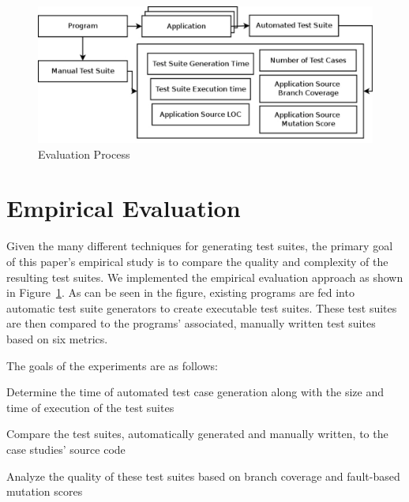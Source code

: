
\begin{figure}[!t]
\centering
\captionsetup{justification=centering}
  \includegraphics[width=\linewidth]{proccess_diagram.pdf}
  \caption{Evaluation Process
  \label{fig:process_diagram}
  }
\end{figure}

\section{Empirical Evaluation}
\label{sec:evaluation}
Given the many different techniques for generating test suites, the primary goal of this paper's empirical study is to compare the quality and complexity of the resulting test suites.  We implemented the empirical evaluation approach as shown in Figure~\ref{fig:process_diagram}.  As can be seen in the figure, existing programs are fed into automatic test suite generators to create executable test suites.  These test suites are then compared to the programs' associated, manually written test suites based on six metrics.   

The goals of the experiments are as follows:
\squishlist
\item Determine the time of automated test case generation along with the size and time of execution of the test suites
\item Compare the test suites, automatically generated and manually written, to the case studies' source code
\item Analyze the quality of these test suites based on branch coverage and fault-based mutation scores
\squishend

